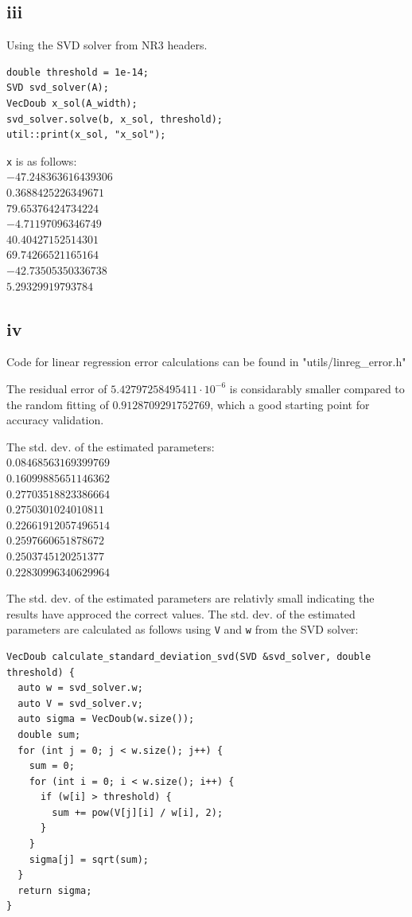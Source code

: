 \documentclass{article}
\begin{document}
\subsection*{iii}
Using the SVD solver from NR3 headers.
\begin{verbatim}
double threshold = 1e-14;
SVD svd_solver(A);
VecDoub x_sol(A_width);
svd_solver.solve(b, x_sol, threshold);
util::print(x_sol, "x_sol");
\end{verbatim}

\texttt{x} is as follows:\\
$-47.248363616439306$\\
$0.3688425226349671$\\
$79.65376424734224$\\
$-4.71197096346749$\\
$40.40427152514301$\\
$69.74266521165164$\\
$-42.73505350336738$\\
$5.29329919793784$

\subsection*{iv}
Code for linear regression error calculations can be found in "utils/linreg\_error.h"

The residual error of $5.42797258495411\cdot 10^{-6}$ is considarably smaller compared to the random fitting of $0.9128709291752769$, which a good starting point for accuracy validation.

The std. dev. of the estimated parameters:\\
$0.08468563169399769$\\
$0.16099885651146362$\\
$0.27703518823386664$\\
$0.2750301024010811$\\
$0.22661912057496514$\\
$0.2597660651878672$\\
$0.2503745120251377$\\
$0.22830996340629964$

The std. dev. of the estimated parameters are relativly small indicating the results have approced the correct values.
The std. dev. of the estimated parameters are calculated as follows using \texttt{V} and \texttt{w} from the SVD solver:
\begin{verbatim}
VecDoub calculate_standard_deviation_svd(SVD &svd_solver, double threshold) {
  auto w = svd_solver.w;
  auto V = svd_solver.v;
  auto sigma = VecDoub(w.size());
  double sum;
  for (int j = 0; j < w.size(); j++) {
    sum = 0;
    for (int i = 0; i < w.size(); i++) {
      if (w[i] > threshold) {
        sum += pow(V[j][i] / w[i], 2);
      }
    }
    sigma[j] = sqrt(sum);
  }
  return sigma;
}
\end{verbatim}  
\end{document}
